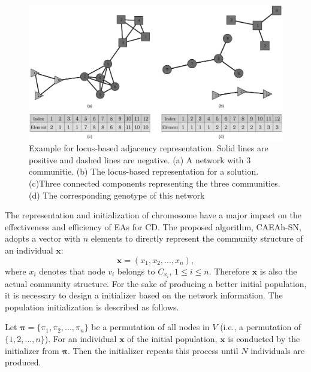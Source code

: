 \documentclass[10pt, journal]{IEEEtran}
\begin{document}
\begin{figure}[!htbp]
 	\centering 
	\thesubfigure
 		\includegraphics[width = 1.0\linewidth]{./Figure/locus-based.eps}
 	 \nonumber
 	\caption{Example for locus-based adjacency representation. Solid lines are positive and dashed lines are negative. (a) A network with 3 communitie. (b) The locus-based representation for a solution. (c)Three connected components representing the three communities. (d) The corresponding genotype of this network}
 	\label{fig:CAEAh-SN:locus-based}
 \end{figure}

The representation and initialization of chromosome have a major impact on the effectiveness and efficiency of EAs for CD. The proposed algorithm, CAEAh-SN, adopts a vector with $n$ elements to directly represent the community structure of an individual $\textbf{x}$:
\begin{equation}
\textbf{x}=(x_{1},x_{2},...,x_{n}),
\end{equation}
where $x_i$ denotes that node $v_i$ belongs to $C_{x_i}$, $1 \leq i \leq n$. Therefore $\textbf{x}$ is also the actual community structure. For the sake of producing a better initial population, it is necessary to design a  initializer based on the network information. The population initialization is described as follows.

Let $\pmb{\pi}=\{\pi_1,\pi_2,...,\pi_n\}$ be a permutation of all nodes in $V$ (i.e., a permutation of $\{1,2,...,n\}$). For an individual $\textbf{x}$ of the initial population, $\textbf{x}$ is conducted by the initializer from $\pmb{\pi}$. Then the initializer repeats this process until $N$ individuals are produced.
\end{document}
